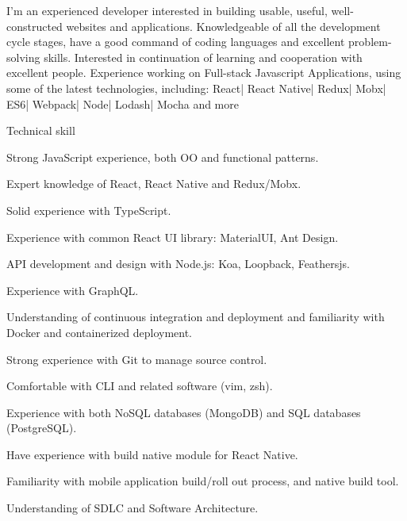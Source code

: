 \documentclass{resume}
\begin{document}

  I'm an experienced developer interested in building usable, useful, well-constructed websites and applications. 
  Knowledgeable of all the development cycle stages, have a good command of coding languages and excellent problem-solving skills.
  Interested in continuation of learning and cooperation with excellent people.
  Experience working on Full-stack Javascript Applications, using some of the latest technologies, including:
  React| React Native| Redux| Mobx| ES6| Webpack| Node| Lodash| Mocha and more

  \begin{rSection}{Technical skill}
    \begin{rSubsection}{}{}{}{}
      \item Strong JavaScript experience, both OO and functional patterns.
      \item Expert knowledge of React, React Native and Redux/Mobx.
      \item Solid experience with TypeScript.
      \item Experience with common React UI library: MaterialUI, Ant Design.
      \item API development and design with Node.js: Koa, Loopback, Feathersjs.
      \item Experience with GraphQL.
      \item Understanding of continuous integration and deployment and familiarity with Docker and containerized deployment.
      \item Strong experience with Git to manage source control.
      \item Comfortable with CLI and related software (vim, zsh).
      \item Experience with both NoSQL databases (MongoDB) and SQL databases (PostgreSQL).
      \item Have experience with build native module for React Native.
      \item Familiarity with mobile application build/roll out process, and native build tool.
      \item Understanding of SDLC and Software Architecture.
    \end{rSubsection}
  \end{rSection}
  
\end{document}
